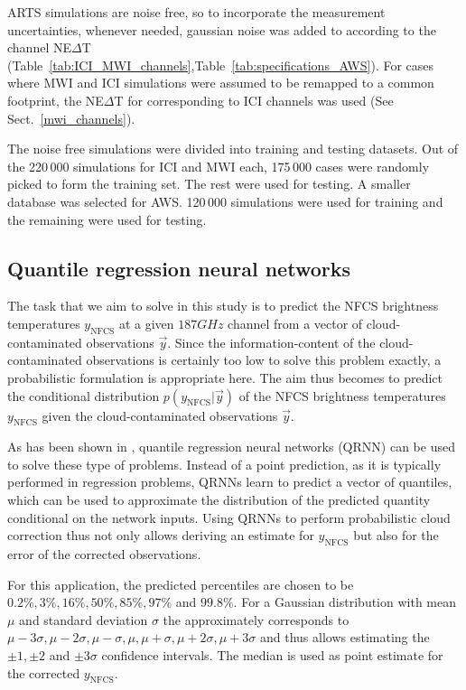 \documentclass[amt, manuscript]{copernicus}
\newcommand{\ynfcs}{y_\text{NFCS}}
\newcommand{\y}{\vec{y}}
\begin{document}
ARTS simulations are noise free, so to incorporate the measurement uncertainties, whenever needed, gaussian noise was added to according to the channel NE$\Delta$T (Table~\ref{tab:ICI_MWI_channels},Table~\ref{tab:specifications_AWS}). For cases where MWI and ICI simulations were assumed to be remapped to a common footprint, the NE$\Delta$T for corresponding to ICI channels was used (See Sect.~\ref{mwi_channels}).

The noise free simulations were divided into training and testing datasets. Out of the 220\,000 simulations for ICI and MWI each, 175\,000 cases were randomly picked to form the training set. The rest were used for testing. A smaller database was selected for AWS. 120\,000 simulations were used for training and the remaining were used for testing.

\subsection{Quantile regression neural networks}
%
The task that we aim to solve in this study is to predict the NFCS brightness
temperatures $\ynfcs$ at a given $187\unit{GHz}$ channel from a vector of
cloud-contaminated observations $\y$. Since the information-content of the
cloud-contaminated observations is certainly too low to solve this problem
exactly, a probabilistic formulation is appropriate here. The aim thus becomes
to predict the conditional distribution $p(\ynfcs | \y)$ of the NFCS brightness
temperatures $\ynfcs$ given the cloud-contaminated observations $\y$.

As has been shown in \citet{pfreundschuh:aneur:18}, quantile regression neural
networks (QRNN) can be used to solve these type of problems. Instead of a point
prediction, as it is typically performed in regression problems, QRNNs learn to
predict a vector of quantiles, which can be used to approximate the distribution
of the predicted quantity conditional on the network inputs. Using QRNNs to
perform probabilistic cloud correction thus not only allows deriving an estimate
for $\ynfcs$ but also for the error of the corrected observations.

For this application, the predicted percentiles are chosen to be
$0.2\%, 3\%, 16\%, 50\%, 85\%, 97\%$ and $99.8\%$. For a Gaussian
distribution with mean $\mu$ and standard deviation $\sigma$ the
approximately corresponds to $\mu -3\sigma, \mu-2\sigma, \mu-\sigma
, \mu, \mu + \sigma, \mu + 2\sigma, \mu + 3\sigma$ and thus allows
estimating the $\pm 1, \pm 2$ and $\pm 3\sigma$ confidence intervals.
The median is used as point estimate for the corrected $\ynfcs$.
\end{document}
